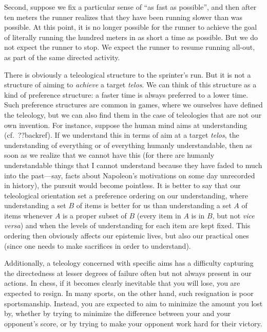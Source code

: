 Second, suppose we fix a particular sense of ``as fast as possible'', and then after ten meters the runner realizes that they have
been running slower than was possible. At this point, it is no longer possible for the runner to achieve the goal of literally running
the hundred meters in as short a time as possible. But we do not expect the runner to stop. We expect the runner to resume running all-out, as part of the
same directed activity.

There is obviously a teleological structure to the sprinter's run. But it is not a structure of aiming to \textit{achieve} a 
target \textit{telos}. 
We can think of this structure as a kind of preference structure: a faster time is always preferred to a lower time. 
Such preference structures are common in games, where we ourselves have defined the teleology, but we can also find them in the 
case of teleologies that are not our own invention. For instance, suppose the human mind aims at understanding (cf.~??backref). If we understand
this in terms of aim at a target \textit{telos}, the understanding of everything or of everything humanly understandable, then as soon as 
we realize that we cannot have this (for there are humanly understandable things that I cannot understand because they have faded to much
into the past---say, facts about Napoleon's motivations on some day unrecorded in history), the pursuit would become pointless. 
It is better to say that our teleological orientation set a preference ordering on our understanding, where understanding a set
$B$ of items is better for us than understanding a set $A$ of items whenever $A$ is a proper subset of $B$ (every item in $A$ is
in $B$, but not \textit{vice versa}) and when the levels of understanding for each item are kept fixed. This ordering then obviously
affects our epistemic lives, but also our practical ones (since one needs to make sacrifices in order to understand).

Additionally, a teleology concerned with specific aims has a difficulty capturing the directedness at lesser
degrees of failure often but not always present in our actions. In chess, if it becomes clearly inevitable that
you will lose, you are expected to resign. In many sports, on the other hand, such resignation is poor sportsmanship.
Instead, you are expected to aim to minimize the amount you lost by, whether by trying to minimize the difference
between your and your opponent's score, or by trying to make your opponent work hard for their victory.

